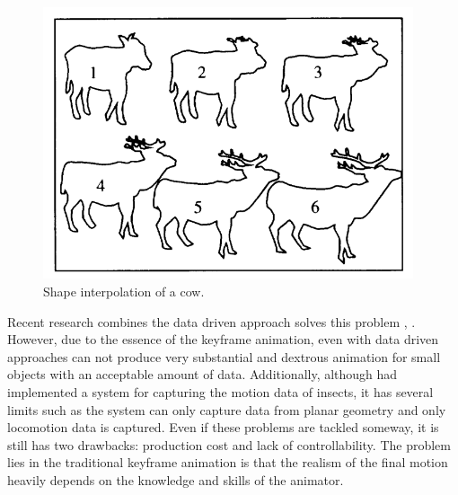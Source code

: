 \begin{figure}[ht!]
\centering
\includegraphics[height=8cm]{figures/cows.png}
\caption{Shape interpolation of a cow.\protect\cite{2d_shape}}
\label{fig:cows}
\end{figure}
Recent research combines the
data driven approach solves this problem \cite{keyframe2}, \cite{keyframe3}.  However, due to the
essence of the keyframe animation, even with data driven approaches
can not produce very substantial and dextrous animation for small
objects with an acceptable amount of data. Additionally, although \cite{keyframe4}
had implemented a system for capturing the motion data of insects, it
has several limits such as the system can only capture data from
planar geometry and only locomotion data is captured. Even if these problems are tackled someway, it is still has two drawbacks: production cost and lack of controllability. The problem lies in the traditional keyframe animation
is that the realism of the final motion heavily depends on the
knowledge and skills of the animator\cite{vince3D}. 
